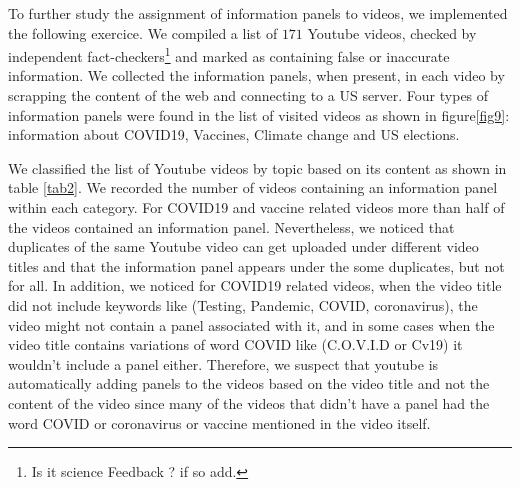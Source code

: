 \documentclass{article}
\begin{document}
To further study the assignment of information panels to videos, we implemented the following exercice. We compiled a list of $171$ Youtube videos, checked by independent fact-checkers\footnote{Is it science Feedback ? if so add.} and marked as containing false or inaccurate information. We collected the information panels, when present, in each video by scrapping the content of the web and connecting to a US server. Four types of information panels were found in the list of visited videos as shown in figure\ref{fig9}:  information about COVID19, Vaccines, Climate change and US elections.

We classified the list of Youtube videos by topic based on its content as shown in table \ref{tab2}. We recorded the number of videos containing an information panel within each category. For COVID19 and vaccine related videos more than half of the videos contained an information panel. Nevertheless, we noticed that duplicates of the same Youtube video can get uploaded under different video titles and that the information panel appears under the some duplicates, but not for all. In addition, we noticed for COVID19 related videos, when the video title did not include keywords like (Testing, Pandemic, COVID, coronavirus), the video might not contain a panel associated with it, and in some cases when the video title contains variations of word COVID like (C.O.V.I.D or Cv19) it wouldn’t include a panel either. Therefore, we suspect that youtube is automatically adding panels to the videos based on the video title and not the content of the video since many of the videos that didn’t have a panel had the word COVID or coronavirus or vaccine mentioned in the video itself. 

\smallskip
\end{document}
